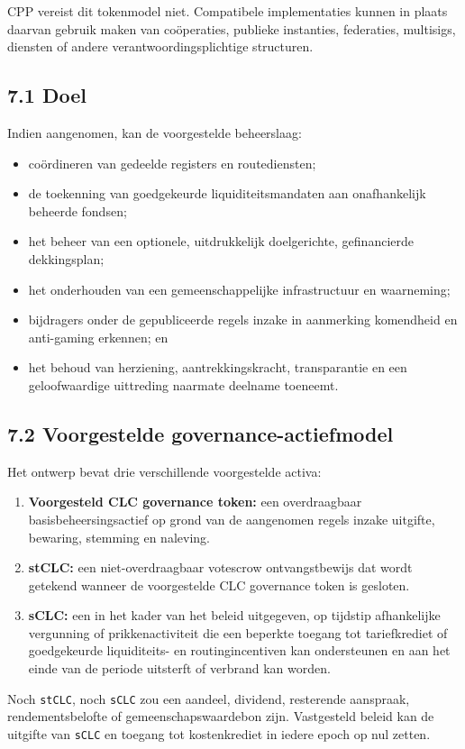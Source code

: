 \documentclass[11pt]{article}
\begin{document}
CPP vereist dit tokenmodel niet. Compatibele implementaties kunnen in plaats daarvan gebruik maken van coöperaties, publieke instanties, federaties, multisigs, diensten of andere verantwoordingsplichtige structuren.

\subsection*{7.1 Doel}

Indien aangenomen, kan de voorgestelde beheerslaag:

\begin{itemize}[leftmargin=*]
\item coördineren van gedeelde registers en routediensten;
\item de toekenning van goedgekeurde liquiditeitsmandaten aan onafhankelijk beheerde fondsen;
\item het beheer van een optionele, uitdrukkelijk doelgerichte, gefinancierde dekkingsplan;
\item het onderhouden van een gemeenschappelijke infrastructuur en waarneming;
\item bijdragers onder de gepubliceerde regels inzake in aanmerking komendheid en anti-gaming erkennen; en
\item het behoud van herziening, aantrekkingskracht, transparantie en een geloofwaardige uittreding naarmate deelname toeneemt.
\end{itemize}
\subsection*{7.2 Voorgestelde governance-actiefmodel}

Het ontwerp bevat drie verschillende voorgestelde activa:

\begin{enumerate}[leftmargin=*]
\item \textbf{Voorgesteld CLC governance token:} een overdraagbaar basisbeheersingsactief op grond van de aangenomen regels inzake uitgifte, bewaring, stemming en naleving.
\item \textbf{stCLC:} een niet-overdraagbaar votescrow ontvangstbewijs dat wordt getekend wanneer de voorgestelde CLC governance token is gesloten.
\item \textbf{sCLC:} een in het kader van het beleid uitgegeven, op tijdstip afhankelijke vergunning of prikkenactiviteit die een beperkte toegang tot tariefkrediet of goedgekeurde liquiditeits- en routingincentiven kan ondersteunen en aan het einde van de periode uitsterft of verbrand kan worden.
\end{enumerate}
Noch \texttt{stCLC}, noch \texttt{sCLC} zou een aandeel, dividend, resterende aanspraak, rendementsbelofte of gemeenschapswaardebon zijn. Vastgesteld beleid kan de uitgifte van \texttt{sCLC} en toegang tot kostenkrediet in iedere epoch op nul zetten.
\end{document}
